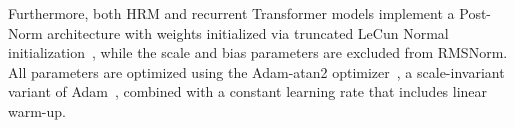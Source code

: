 Furthermore, both HRM and recurrent Transformer models implement a Post-Norm architecture with weights initialized via truncated LeCun Normal initialization~\cite{Klambauer2017SelfNormalizingNN, jax_lecun_normal_initializer,lecun2002efficient}, while the scale and bias parameters are excluded from RMSNorm. All parameters are optimized using the Adam-atan2 optimizer~\citep{EXWANLGSKLP-2024}, a scale-invariant variant of Adam~\citep{KB-2017}, combined with a constant learning rate that includes linear warm-up.